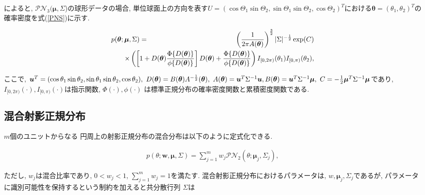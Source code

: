 \documentclass[a4j,12pt]{jarticle}
\begin{document}

\citet{GPN}によると, $\mathcal{PN}_3(\bm \mu,\Sigma$)の球形データの場合, 単位球面上の方向を表す$U = (\cos\Theta_1 \sin \Theta_2, \sin\Theta_1 \sin \Theta_2, \cos \Theta_2)^T$における$\bm \theta = (\theta_1, \theta_2)^T$の確率密度を式(\ref{PNS})に示す.

\begin{eqnarray}
\label{PNS}
p(\bm \theta; \bm \mu, \Sigma) &=& \left(\frac{1}{2\pi A(\bm \theta)}\right)^{\frac{3}{2}} |\Sigma|^{-\frac{1}{2}}
\exp(C) \nonumber \\ 
&& \hspace{-1.5cm} \times \left( \left[1 + D(\bm \theta) \frac{\Phi \{D(\bm \theta)\}}{\phi \{D(\bm \theta)\}} \right] D(\bm \theta) + \frac{\Phi \{D(\bm \theta)\}}{\phi \{D(\bm \theta)\}} \right) I_{[0,2\pi)}(\theta_1) I_{[0,\pi)}(\theta_2),
\end{eqnarray}

\noindent
ここで, $\bm u^T = (\cos\theta_1 \sin \theta_2, \sin\theta_1 \sin \theta_2, \cos \theta_2), 
\ D(\bm \theta) = B(\bm \theta) A^{-\frac{1}{2}}(\bm \theta), \ A(\bm \theta) = \bm u^T \Sigma^{-1} \bm u,\\ B(\bm \theta) = \bm u^T \Sigma^{-1} \bm \mu, \ C = -\frac{1}{2} \bm \mu^T \Sigma^{-1} \bm \mu$であり, $I_{[0,2\pi)} (\cdot), I_{[0,\pi)}(\cdot)$は指示関数, $\Phi(\cdot), \phi(\cdot)$ は標準正規分布の確率密度関数と累積密度関数である. 

\subsection{混合射影正規分布}
$m$個のユニットからなる 円周上の射影正規分布の混合分布は以下のように定式化できる. 

\begin{eqnarray*}
\label{MPNC}
p(\theta;\bm w,\bm \mu, \Sigma) = \sum^m_{j=1} w_j \mathcal{PN}_2(\theta;\bm \mu_j, \Sigma_j),
\end{eqnarray*}

\noindent
ただし, $w_j$は混合比率であり, $0 < w_j < 1$, $\sum^m_{j=1} w_j = 1$を満たす. 混合射影正規分布におけるパラメータは, $w, \bm \mu_j, \Sigma_j$であるが, パラメータに識別可能性を保持するという制約を加えると共分散行列 $\Sigma$は
\end{document}
